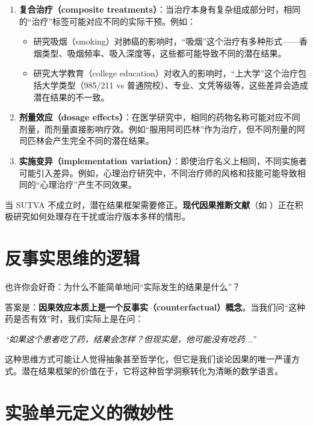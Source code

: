 \begin{enumerate}
  \item \textbf{复合治疗（composite treatments）}：当治疗本身有复杂组成部分时，相同的``治疗''标签可能对应不同的实际干预。例如：
  \begin{itemize}
    \item 研究吸烟（smoking）对肺癌的影响时，``吸烟''这个治疗有多种形式——香烟类型、吸烟频率、吸入深度等，这些都可能导致不同的潜在结果。
    \item 研究大学教育（college education）对收入的影响时，``上大学''这个治疗包括大学类型（985/211 vs 普通院校）、专业、文凭等级等，这些差异会造成潜在结果的不一致。
  \end{itemize}

  \item \textbf{剂量效应（dosage effects）}：在医学研究中，相同的药物名称可能对应不同剂量，而剂量直接影响疗效。例如``服用阿司匹林''作为治疗，但不同剂量的阿司匹林会产生完全不同的潜在结果。

  \item \textbf{实施变异（implementation variation）}：即使治疗名义上相同，不同实施者可能引入差异。例如，心理治疗研究中，不同治疗师的风格和技能可能导致相同的``心理治疗''产生不同效果。
\end{enumerate}

当 SUTVA 不成立时，潜在结果框架需要修正。\textbf{现代因果推断文献}（如 \cite{halloran1996}）正在积极研究如何处理存在干扰或治疗版本多样的情形。


\section{反事实思维的逻辑}

也许你会好奇：为什么不能简单地问``实际发生的结果是什么''？

答案是：\textbf{因果效应本质上是一个反事实（counterfactual）概念}。当我们问``这种药是否有效''时，我们实际上是在问：

\begin{center}
\textit{``如果这个患者吃了药，结果会怎样？但现实是，他可能没有吃药...''}
\end{center}

这种思维方式可能让人觉得抽象甚至哲学化，但它是我们谈论因果的唯一严谨方式。潜在结果框架的价值在于，它将这种哲学洞察转化为清晰的数学语言。

\section{实验单元定义的微妙性}

